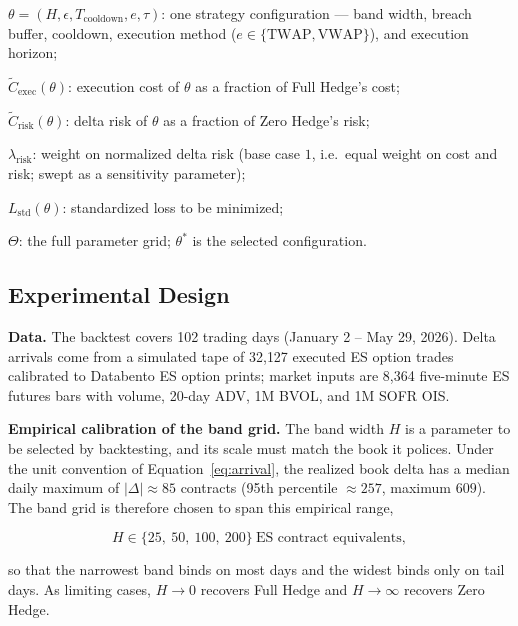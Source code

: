 \documentclass{article}
\begin{document}
\begin{vardefs}
\item $\theta = (H, \epsilon, T_{\text{cooldown}}, e, \tau)$: one strategy configuration
  --- band width, breach buffer, cooldown, execution method ($e \in \{\text{TWAP},
  \text{VWAP}\}$), and execution horizon;
\item $\widetilde{C}_{\text{exec}}(\theta)$: execution cost of $\theta$ as a fraction of
  Full Hedge's cost;
\item $\widetilde{C}_{\text{risk}}(\theta)$: delta risk of $\theta$ as a fraction of
  Zero Hedge's risk;
\item $\lambda_{\text{risk}}$: weight on normalized delta risk (base case $1$, i.e.\
  equal weight on cost and risk; swept as a sensitivity parameter);
\item $L_{\text{std}}(\theta)$: standardized loss to be minimized;
\item $\Theta$: the full parameter grid; $\theta^{*}$ is the selected configuration.
\end{vardefs}

\subsection{Experimental Design}

\textbf{Data.} The backtest covers 102 trading days (January 2 -- May 29, 2026). Delta
arrivals come from a simulated tape of 32{,}127 executed ES option trades calibrated to
Databento ES option prints; market inputs are 8{,}364 five-minute ES futures bars with
volume, 20-day ADV, 1M BVOL, and 1M SOFR OIS.

\textbf{Empirical calibration of the band grid.} The band width $H$ is a parameter to be
selected by backtesting, and its scale must match the book it polices. Under the unit
convention of Equation~\eqref{eq:arrival}, the realized book delta has a median daily
maximum of $\lvert \Delta \rvert \approx 85$ contracts (95th percentile $\approx 257$,
maximum $609$). The band grid is therefore chosen to span this empirical range,

\begin{eqbox}
\begin{equation}
H \in \{25,\ 50,\ 100,\ 200\} \ \text{ES contract equivalents},
\end{equation}
\end{eqbox}

so that the narrowest band binds on most days and the widest binds only on tail days. As
limiting cases, $H \to 0$ recovers Full Hedge and $H \to \infty$ recovers Zero Hedge.
\end{document}
